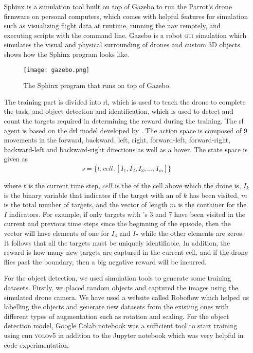 \documentclass[../main.tex]{subfiles}
\begin{document}
Sphinx is a simulation 
tool built on top of Gazebo 
to run the Parrot's drone firmware on 
personal computers, which comes with helpful 
features for simulation such as visualizing flight 
data at runtime, running the \gls{uav} remotely, 
and executing scripts with the command line. 
Gazebo is a robot \textsc{gui} simulation 
which simulates the visual and physical surrounding 
of drones and custom 3D objects. 
 shows how the Sphinx 
program looks like. 

\begin{figure}[tbp]
    \centering
    \texttt{[image: gazebo.png]}
    \caption{The Sphinx program that runs on top of Gazebo.}
    \label{fig:gazebo}
\end{figure}

The training part is divided into \gls{rl}, 
which is used to teach the \anafi drone to complete the task, 
and object detection and identification, 
which is used to detect and count the targets
required in determining the reward during the training. 
The \gls{rl} agent is based on the \gls{drl} model 
developed by \textcite{Ged21}. The action space is composed 
of 9 movements in the 
forward, backward, left,
right, forward-left, forward-right, backward-left and 
backward-right directions as well as a hover.
The state space is given as
\begin{align}
    s = \{ t, cell, [ I_1, I_2, I_3, \ldots, I_m] \} 
    \label{eq:state-space}
\end{align}

\noindent 
where $t$ is the current time step, $cell$ is the \id of the
cell above which the drone is, $I_k$ is the binary variable 
that indicates if the target with an \id of $k$ has been
visited, $m$ is the total number of targets,
and the vector of length $m$ is the container for the
$I$ indicators. 
For example,
if only targets with \id's 3 and 7 have been visited
in the current and previous time steps since the beginning of the 
episode,
then the vector will have elements of one for $I_3$ and $I_7$ while
the other elements are zeros.
It follows that all the targets must be uniquely identifiable.
In addition, the reward is how many new targets are captured 
in the current cell,
and if the drone flies past the boundary, then a big negative
reward will be incurred.

For the object detection, we used simulation tools to 
generate some training datasets. Firstly, 
we placed random objects and captured the images 
using the simulated drone camera. We have used a 
website called Roboflow which helped us labelling 
the objects and generate new datasets from the 
existing ones with different types of augmentation 
such as rotation and scaling. 
For the object detection model, Google Colab notebook 
was a sufficient tool to start training using 
\gls{cnn} \textsc{yolo}v5 in addition to the 
Jupyter notebook which was very helpful 
in code experimentation. 
\end{document}
